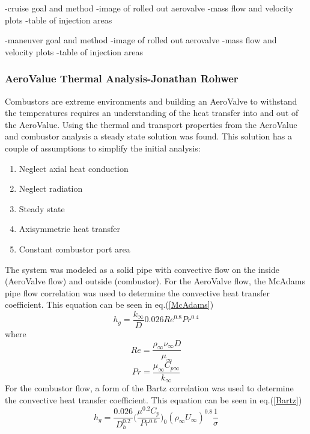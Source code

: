 -cruise goal and method
-image of rolled out aerovalve
-mass flow and velocity plots
-table of injection areas

-maneuver goal and method
-image of rolled out aerovalve
-mass flow and velocity plots
-table of injection areas

\subsubsection{AeroValue Thermal Analysis-Jonathan Rohwer}

Combustors are extreme environments and building an AeroValve to withstand the temperatures requires an understanding of the heat transfer into and out of the AeroValue. Using the thermal and transport properties from the AeroValue and combustor analysis a steady state solution was found. This solution has a couple of assumptions to simplify the initial analysis: \\
\begin{enumerate}
    \item Neglect axial heat conduction
    \item Neglect radiation
    \item Steady state
    \item Axisymmetric heat transfer
    \item Constant combustor port area \\
\end{enumerate}
The system was modeled as a solid pipe with convective flow on the inside (AeroValve flow) and outside (combustor). For the AeroValve flow, the McAdams pipe flow correlation was used to determine the convective heat transfer coefficient. This equation can be seen in eq.(\ref{McAdams})
\begin{equation}
    h_g=\frac{k_\infty}{D}0.026Re^{0.8}Pr^{0.4}
    \label{McAdams}
\end{equation}
where
\begin{equation}
    Re=\frac{\rho_\infty\nu_\infty D}{\mu_\infty}
\end{equation}
\begin{equation}
    Pr=\frac{\mu_\infty C_{p\infty}}{k_\infty}
\end{equation}
For the combustor flow, a form of the Bartz correlation was used to determine the convective heat transfer coefficient. This equation can be seen in eq.(\ref{Bartz})
\begin{equation}
    h_g=\frac{0.026}{D_h^{0.2}}\Big(\frac{\mu^{0.2}C_p}{Pr^{0.6}}\Big)_0(\rho_\infty U_\infty)^{0.8}\frac{1}{\sigma}
    \label{Bartz}
\end{equation}
